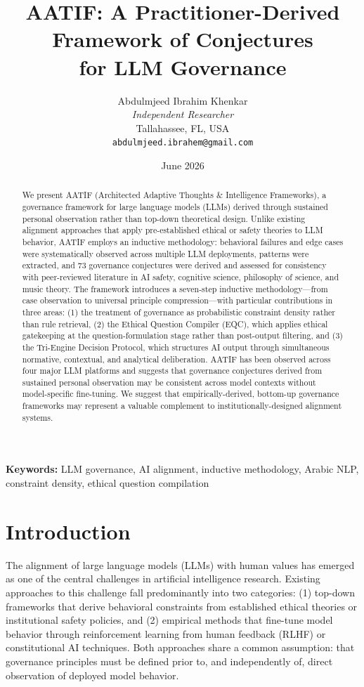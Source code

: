 \documentclass[11pt,a4paper]{article}
\title{AATIF: A Practitioner-Derived Framework of Conjectures\\for LLM Governance}
\author{Abdulmjeed Ibrahim Khenkar\\
\textit{Independent Researcher}\\
Tallahassee, FL, USA\\
\texttt{abdulmjeed.ibrahem@gmail.com}}
\date{June 2026}
\begin{document}
\maketitle

\begin{abstract}
We present AATIF (Architected Adaptive Thoughts \& Intelligence Frameworks), a governance framework for large language models (LLMs) derived through sustained personal observation rather than top-down theoretical design. Unlike existing alignment approaches that apply pre-established ethical or safety theories to LLM behavior, AATIF employs an inductive methodology: behavioral failures and edge cases were systematically observed across multiple LLM deployments, patterns were extracted, and 73 governance conjectures were derived and assessed for consistency with peer-reviewed literature in AI safety, cognitive science, philosophy of science, and music theory. The framework introduces a seven-step inductive methodology---from case observation to universal principle compression---with particular contributions in three areas: (1) the treatment of governance as probabilistic constraint density rather than rule retrieval, (2) the Ethical Question Compiler (EQC), which applies ethical gatekeeping at the question-formulation stage rather than post-output filtering, and (3) the Tri-Engine Decision Protocol, which structures AI output through simultaneous normative, contextual, and analytical deliberation. AATIF has been observed across four major LLM platforms and suggests that governance conjectures derived from sustained personal observation may be consistent across model contexts without model-specific fine-tuning. We suggest that empirically-derived, bottom-up governance frameworks may represent a valuable complement to institutionally-designed alignment systems.
\end{abstract}

\noindent\textbf{Keywords:} LLM governance, AI alignment, inductive methodology, Arabic NLP, constraint density, ethical question compilation

\section{Introduction}

The alignment of large language models (LLMs) with human values has emerged as one of the central challenges in artificial intelligence research. Existing approaches to this challenge fall predominantly into two categories: (1) top-down frameworks that derive behavioral constraints from established ethical theories or institutional safety policies, and (2) empirical methods that fine-tune model behavior through reinforcement learning from human feedback (RLHF) or constitutional AI techniques. Both approaches share a common assumption: that governance principles must be defined prior to, and independently of, direct observation of deployed model behavior.
\end{document}

